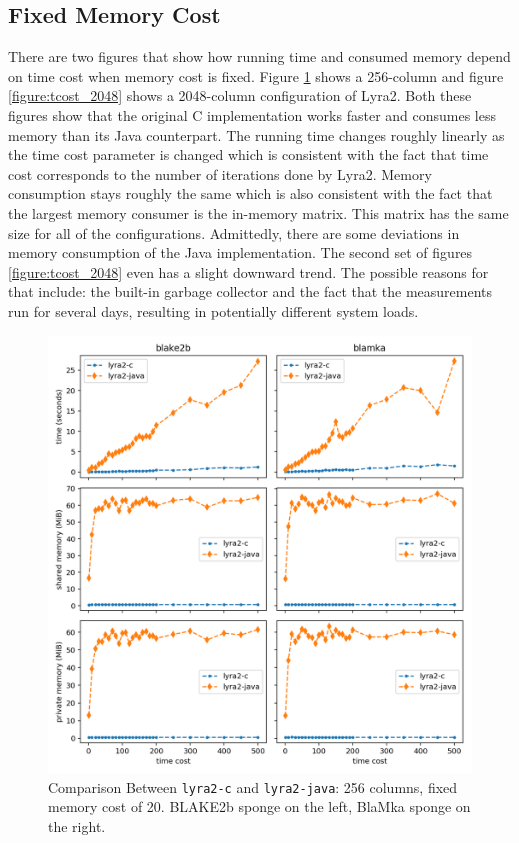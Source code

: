 \subsection{Fixed Memory Cost}
\label{sec:fixed-memory-cost}

There are two figures that show how running time and consumed memory depend on time cost when memory cost is fixed. Figure \ref{figure:tcost_256} shows a 256-column and figure \ref{figure:tcost_2048} shows a 2048-column configuration of Lyra2. Both these figures show that the original C implementation works faster and consumes less memory than its Java counterpart. The running time changes roughly linearly as the time cost parameter is changed which is consistent with the fact that time cost corresponds to the number of iterations done by Lyra2. Memory consumption stays roughly the same which is also consistent with the fact that the largest memory consumer is the in-memory matrix. This matrix has the same size for all of the configurations. Admittedly, there are some deviations in memory consumption of the Java implementation. The second set of figures \ref{figure:tcost_2048} even has a slight downward trend. The possible reasons for that include: the built-in garbage collector and the fact that the measurements run for several days, resulting in potentially different system loads.

\begin{figure}[H]
    \centering
    \includegraphics[width=\linewidth,keepaspectratio]{figures/tcost_256}
    \caption{Comparison Between \texttt{lyra2-c} and \texttt{lyra2-java}: 256 columns, fixed memory cost of 20. BLAKE2b sponge on the left, BlaMka sponge on the right.}
    \label{figure:tcost_256}
\end{figure}

